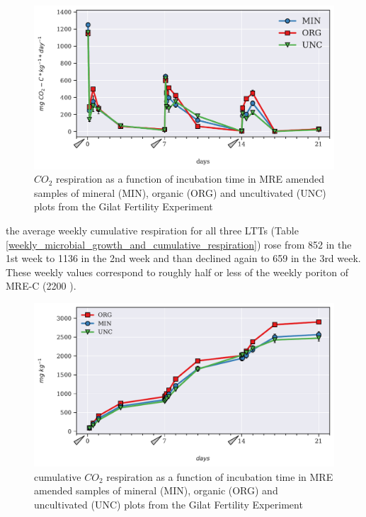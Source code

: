 		\begin{figure}[H]
			\centering
			\includegraphics[scale=0.8, width=\linewidth]{thesis_figures/main_incubation/MRE_treated/Resp.pdf}
			\caption{$CO_2$ respiration as a function of incubation time in MRE amended samples of mineral (MIN), organic (ORG) and uncultivated (UNC) plots from the Gilat Fertility Experiment}
			\label{fig:resp_treated_main}
		\end{figure}
		\noindent
		the average weekly cumulative respiration for all three LTTs (Table \ref{weekly_microbial_growth_and_cumulative_respiration}) rose from 852 \cumrespunit in the 1st week to 1136 \cumrespunit in the 2nd week and than declined again to 659 \cumrespunit in the 3rd week. These weekly values correspond to roughly half or less of the weekly poriton of MRE-C (2200 \genericunit).


		\begin{figure}[H]
			\centering
			\includegraphics[scale=0.8, width=\linewidth]{thesis_figures/test/Cum_Resp.pdf}
			\caption{cumulative $CO_2$ respiration  as a function of incubation time in MRE amended samples of mineral (MIN), organic (ORG) and uncultivated (UNC) plots from the Gilat Fertility Experiment}
			\label{fig:cum_resp_treated_main}
		\end{figure}

